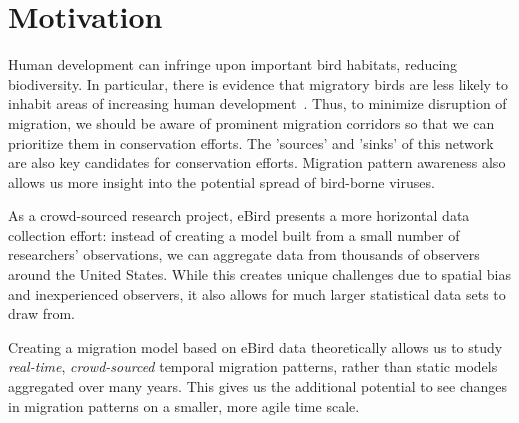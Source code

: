 \section{Motivation}
Human development can infringe upon important bird habitats, reducing biodiversity. In particular, there is evidence that migratory birds are less likely to inhabit areas of increasing human development~\cite{riparian}. Thus, to minimize disruption of migration, we should be aware of prominent migration corridors so that we can prioritize them in conservation efforts. The 'sources' and 'sinks' of this network are also key candidates for conservation efforts. Migration pattern awareness also allows us more insight into the potential spread of bird-borne viruses.

As a crowd-sourced research project, eBird presents a more horizontal data collection effort: instead of creating a model built from a small number of researchers' observations, we can aggregate data from thousands of observers around the United States. While this creates unique challenges due to spatial bias and inexperienced observers, it also allows for much larger statistical data sets to draw from. 

Creating a migration model based on eBird data theoretically allows us to study \textit{real-time}, \textit{crowd-sourced} temporal migration patterns, rather than static models aggregated over many years. This gives us the additional potential to see changes in migration patterns on a smaller, more agile time scale.